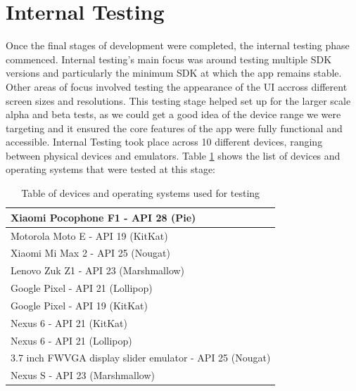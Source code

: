 \section{Internal Testing}
Once the final stages of development were completed, the internal testing phase commenced. Internal testing's main focus was around testing multiple SDK versions and particularly the minimum SDK at which the app remains stable. Other areas of focus involved testing the appearance of the UI accross different screen sizes and resolutions. This testing stage helped set up for the larger scale alpha and beta tests, as we could get a good idea of the device range we were targeting and it ensured the core features of the app were fully functional and accessible. Internal Testing took place across 10 different devices, ranging between physical devices and emulators. Table \ref{devicetable} shows the list of devices and operating systems that were tested at this stage:
\begin{table}[ht]
\centering
\begin{tabular}{|l|}
\hline
Xiaomi Pocophone F1 - API 28 (Pie)                       \\ \hline
Motorola Moto E - API 19 (KitKat)                        \\ \hline
Xiaomi Mi Max 2 - API 25 (Nougat)                        \\ \hline
Lenovo Zuk Z1 - API 23 (Marshmallow)                     \\ \hline
Google Pixel - API 21 (Lollipop)                         \\ \hline
Google Pixel - API 19 (KitKat)                           \\ \hline
Nexus 6 - API 21 (KitKat)                                \\ \hline
Nexus 6 - API 21 (Lollipop)                              \\ \hline
3.7 inch FWVGA display slider emulator - API 25 (Nougat) \\ \hline
Nexus S - API 23 (Marshmallow)                           \\ \hline
\end{tabular}
\caption{Table of devices and operating systems used for testing}
\label{devicetable}
\end{table}
\par

